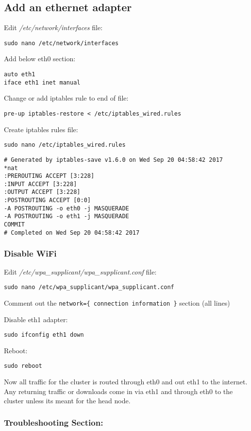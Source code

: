\documentclass[]{article}
\begin{document}
\subsection{Add an ethernet adapter}\label{add-an-ethernet-adapter}

Edit \emph{/etc/network/interfaces} file:

\texttt{sudo\ nano\ /etc/network/interfaces}

Add below eth0 section:

\begin{verbatim}
auto eth1
iface eth1 inet manual
\end{verbatim}

Change or add iptables rule to end of file:

\texttt{pre-up\ iptables-restore\ \textless{}\ /etc/iptables\_wired.rules}

Create iptables rules file:

\texttt{sudo\ nano\ /etc/iptables\_wired.rules}

\begin{verbatim}
# Generated by iptables-save v1.6.0 on Wed Sep 20 04:58:42 2017
*nat
:PREROUTING ACCEPT [3:228]
:INPUT ACCEPT [3:228]
:OUTPUT ACCEPT [3:228]
:POSTROUTING ACCEPT [0:0]
-A POSTROUTING -o eth0 -j MASQUERADE
-A POSTROUTING -o eth1 -j MASQUERADE
COMMIT
# Completed on Wed Sep 20 04:58:42 2017
\end{verbatim}

\subsubsection{Disable WiFi}\label{disable-wifi}

Edit \emph{/etc/wpa\_supplicant/wpa\_supplicant.conf} file:

\texttt{sudo\ nano\ /etc/wpa\_supplicant/wpa\_supplicant.conf}

Comment out the \texttt{network=\{\ connection\ information\ \}} section
(all lines)

Disable eth1 adapter:

\texttt{sudo\ ifconfig\ eth1\ down}

Reboot:

\texttt{sudo\ reboot}

Now all traffic for the cluster is routed through eth0 and out eth1 to
the internet. Any returning traffic or downloads come in via eth1 and
through eth0 to the cluster unless its meant for the head node.

\subsubsection{Troubleshooting Section:}\label{troubleshooting-section}
\end{document}
